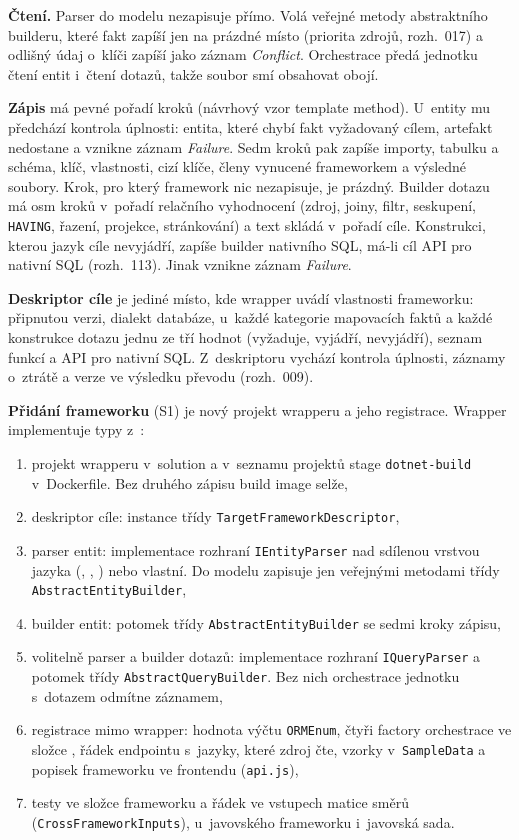 \textbf{Čtení.} Parser do modelu nezapisuje přímo. Volá veřejné metody abstraktního builderu, které fakt zapíší jen na prázdné místo (priorita zdrojů, rozh.~017) a odlišný údaj o~klíči zapíší jako záznam \emph{Conflict}. Orchestrace předá jednotku čtení entit i~čtení dotazů, takže soubor smí obsahovat obojí.

\textbf{Zápis} má pevné pořadí kroků (návrhový vzor template method). U~entity mu předchází kontrola úplnosti: entita, které chybí fakt vyžadovaný cílem, artefakt nedostane a vznikne záznam \emph{Failure}. Sedm kroků pak zapíše importy, tabulku a schéma, klíč, vlastnosti, cizí klíče, členy vynucené frameworkem a výsledné soubory. Krok, pro který framework nic nezapisuje, je prázdný. Builder dotazu má osm kroků v~pořadí relačního vyhodnocení (zdroj, joiny, filtr, seskupení, \texttt{HAVING}, řazení, projekce, stránkování) a text skládá v~pořadí cíle. Konstrukci, kterou jazyk cíle nevyjádří, zapíše builder nativního SQL, má-li cíl API pro nativní SQL (rozh.~113). Jinak vznikne záznam \emph{Failure}.

\textbf{Deskriptor cíle} je jediné místo, kde wrapper uvádí vlastnosti frameworku: připnutou verzi, dialekt databáze, u~každé kategorie mapovacích faktů a každé konstrukce dotazu jednu ze tří hodnot (vyžaduje, vyjádří, nevyjádří), seznam funkcí a API pro nativní SQL. Z~deskriptoru vychází kontrola úplnosti, záznamy o~ztrátě a verze ve výsledku převodu (rozh.~009).

\textbf{Přidání frameworku} (S1) je nový projekt wrapperu a jeho registrace. Wrapper implementuje typy z~:

\begin{enumerate}[leftmargin=*,itemsep=1pt]
\item projekt wrapperu v~solution a v~seznamu projektů stage \texttt{dotnet-build} v~Dockerfile. Bez druhého zápisu build image selže,
\item deskriptor cíle: instance třídy \texttt{TargetFrameworkDescriptor},
\item parser entit: implementace rozhraní \texttt{IEntityParser} nad sdílenou vrstvou jazyka (, , ) nebo vlastní. Do modelu zapisuje jen veřejnými metodami třídy \texttt{AbstractEntityBuilder},
\item builder entit: potomek třídy \texttt{AbstractEntityBuilder} se sedmi kroky zápisu,
\item volitelně parser a builder dotazů: implementace rozhraní \texttt{IQueryParser} a potomek třídy \texttt{AbstractQueryBuilder}. Bez nich orchestrace jednotku s~dotazem odmítne záznamem,
\item registrace mimo wrapper: hodnota výčtu \texttt{ORMEnum}, čtyři factory orchestrace ve složce , řádek endpointu  s~jazyky, které zdroj čte, vzorky v~\texttt{SampleData} a popisek frameworku ve frontendu (\texttt{api.js}),
\item testy ve složce frameworku a řádek ve vstupech matice směrů (\texttt{CrossFrameworkInputs}), u~javovského frameworku i~javovská sada.
\end{enumerate}

